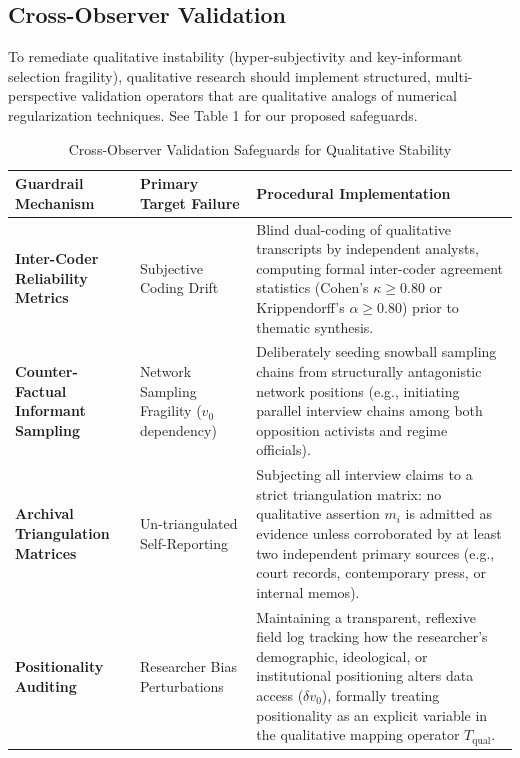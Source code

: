 \documentclass{article}
\theoremstyle{definition}
\begin{document}
\subsection{Cross-Observer Validation}

To remediate qualitative instability (hyper-subjectivity and key-informant selection fragility), qualitative research should implement structured, multi-perspective validation operators that are qualitative analogs of numerical regularization techniques. See Table 1 for our proposed safeguards.

\begin{table}[htbp]
\centering
\caption{Cross-Observer Validation Safeguards for Qualitative Stability}
\label{tab:qualitative_safeguards}
\small
\begin{tabular}{p{3.8cm} p{3.2cm} p{7.5cm}}
\toprule
\textbf{Guardrail Mechanism} & \textbf{Primary Target Failure} & \textbf{Procedural Implementation} \\
\midrule
\textbf{Inter-Coder Reliability Metrics} & 
Subjective Coding Drift & 
Blind dual-coding of qualitative transcripts by independent analysts, computing formal inter-coder agreement statistics (Cohen’s $\kappa \ge 0.80$ or Krippendorff’s $\alpha \ge 0.80$) prior to thematic synthesis. \\
\addlinespace
\textbf{Counter-Factual Informant Sampling} & 
Network Sampling Fragility ($v_0$ dependency) & 
Deliberately seeding snowball sampling chains from structurally antagonistic network positions (e.g., initiating parallel interview chains among both opposition activists and regime officials). \\
\addlinespace
\textbf{Archival Triangulation Matrices} & 
Un-triangulated Self-Reporting & 
Subjecting all interview claims to a strict triangulation matrix: no qualitative assertion $m_i$ is admitted as evidence unless corroborated by at least two independent primary sources (e.g., court records, contemporary press, or internal memos). \\
\addlinespace
\textbf{Positionality Auditing} & 
Researcher Bias Perturbations & 
Maintaining a transparent, reflexive field log tracking how the researcher’s demographic, ideological, or institutional positioning alters data access ($\delta v_0$), formally treating positionality as an explicit variable in the qualitative mapping operator $T_{\text{qual}}$. \\
\bottomrule
\end{tabular}
\end{table}
\end{document}
